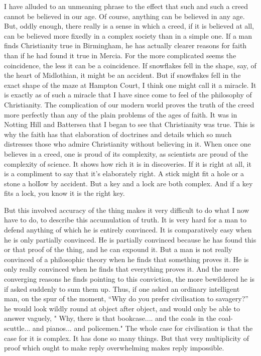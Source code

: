 \documentclass{book}
\begin{document}
I have alluded to an unmeaning phrase to the effect that such and such a creed cannot be believed in our age. Of course, anything can be believed in any age. But, oddly enough, there really is a sense in which a creed, if it is believed at all, can be believed more fixedly in a complex society than in a simple one. If a man finds Christianity true in Birmingham, he has actually clearer reasons for faith than if he had found it true in Mercia. For the more complicated seems the coincidence, the less it can be a coincidence. If snowflakes fell in the shape, say, of the heart of Midlothian, it might be an accident. But if snowflakes fell in the exact shape of the maze at Hampton Court, I think one might call it a miracle. It is exactly as of such a miracle that I have since come to feel of the philosophy of Christianity. The complication of our modern world proves the truth of the creed more perfectly than any of the plain problems of the ages of faith. It was in Notting Hill and Battersea that I began to see that Christianity was true. This is why the faith has that elaboration of doctrines and details which so much distresses those who admire Christianity without believing in it. When once one believes in a creed, one is proud of its complexity, as scientists are proud of the complexity of science. It shows how rich it is in discoveries. If it is right at all, it is a compliment to say that it’s elaborately right. A stick might fit a hole or a stone a holIow by accident. But a key and a lock are both complex. And if a key fits a lock, you know it is the right key.

But this involved accuracy of the thing makes it very difficult to do what I now have to do, to describe this accumulation of truth. It is very hard for a man to defend anything of which he is entirely convinced. It is comparatively easy when he is only partially convinced. He is partially convinced because he has found this or that proof of the thing, and he can expound it. But a man is not really convinced of a philosophic theory when he finds that something proves it. He is only really convinced when he finds that everything proves it. And the more converging reasons he finds pointing to this conviction, the more bewildered he is if asked suddenly to sum them up. Thus, if one asked an ordinary intelligent man, on the spur of the moment, “Why do you prefer civilisation to savagery?” he would look wildly round at object after object, and would only be able to answer vaguely, " Why, there is that bookcase.... and the coals in the coal-scuttle... and pianos... and policemen." The whole case for civilisation is that the case for it is complex. It has done so many things. But that very multiplicity of proof which ought to make reply overwhelming makes reply impossible.
\end{document}
